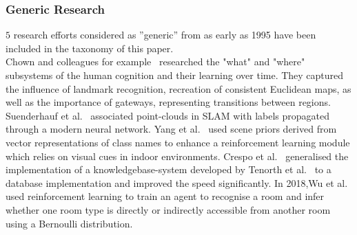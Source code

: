 \documentclass[twocolumn,letterpaper]{IEEEAerospaceCLS}  %
\begin{document}
\subsubsection{Generic Research} \label{sssec:ResLitHist}
$5$ research efforts considered as ''generic'' from as early as 1995  have been included in the taxonomy of this paper.\\
Chown and colleagues for example~\cite{chown_prototypes_1995} researched the "what" and "where" subsystems of the human cognition and their learning over time. They captured the influence of landmark recognition, recreation of consistent Euclidean maps, as well as the importance of gateways, representing transitions between regions. Suenderhauf et al.~\cite{sunderhauf_meaningful_2017} associated point-clouds in SLAM with labels propagated through a modern neural network. Yang et al.~\cite{yang_visual_2018} used scene priors derived from vector representations of class names to enhance a reinforcement learning module which relies on visual cues in indoor environments. Crespo et al.~\cite{crespo_reasoning_2018} generalised the implementation of a knowledgebase-system developed by Tenorth et al.~\cite{tenorth_knowrob-map_2010} to a database implementation and improved the speed significantly. In 2018,Wu et al.~\cite{wu_learning_2018} used reinforcement learning to train an agent to recognise a room and infer whether one room type is directly or indirectly accessible from another room using a Bernoulli distribution.
\end{document}

